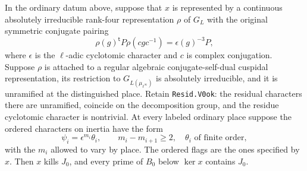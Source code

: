 \begin{theorem}
\label{thm:rh-ordinary-four-seed-component}
In the ordinary datum above, suppose that $x$ is represented by a
continuous absolutely irreducible rank-four representation $\rho$ of
$G_L$ with the original symmetric conjugate pairing
\[
        \rho(g)^{\mathsf t}P\rho(cgc^{-1})=\epsilon(g)^{-3}P,
\]
where $\epsilon$ is the $\ell$-adic cyclotomic character and $c$ is
complex conjugation. Suppose $\rho$ is attached to a regular algebraic
conjugate-self-dual cuspidal representation, its restriction to
$G_{L(\mu_{\ell^\infty})}$ is absolutely irreducible, and it is
unramified at the distinguished place. Retain \texttt{Resid.V0ok}:
the residual characters there are unramified, coincide on the
decomposition group, and the residue cyclotomic character is nontrivial.
At every labeled ordinary place suppose the ordered characters on
inertia have the form
\[
         \psi_i=\epsilon^{m_i}\theta_i,\qquad
          m_i-m_{i+1}\geq2,\quad \theta_i\text{ of finite order},
\]
with the $m_i$ allowed to vary by place. The ordered flags are the
ones specified by $x$. Then $x$ kills $J_0$, and every prime of $B_0$
below $\ker x$ contains $J_0$.
\end{theorem}
